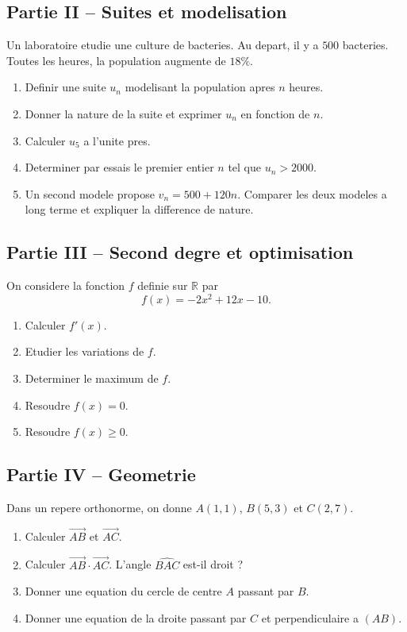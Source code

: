 \documentclass[11pt,a4paper]{article}
\newcommand{\R}{\mathbb{R}}
\newcommand{\vect}[1]{\overrightarrow{#1}}
\begin{document}
\subsection*{Partie II -- Suites et modelisation}
Un laboratoire etudie une culture de bacteries. Au depart, il y a $500$ bacteries. Toutes les heures, la population augmente de $18\%$.
\begin{enumerate}
  \item Definir une suite $u_n$ modelisant la population apres $n$ heures.
  \item Donner la nature de la suite et exprimer $u_n$ en fonction de $n$.
  \item Calculer $u_5$ a l'unite pres.
  \item Determiner par essais le premier entier $n$ tel que $u_n>2000$.
  \item Un second modele propose $v_n=500+120n$. Comparer les deux modeles a long terme et expliquer la difference de nature.
\end{enumerate}

\subsection*{Partie III -- Second degre et optimisation}
On considere la fonction $f$ definie sur $\R$ par
\[
f(x)=-2x^2+12x-10.
\]
\begin{enumerate}
  \item Calculer $f'(x)$.
  \item Etudier les variations de $f$.
  \item Determiner le maximum de $f$.
  \item Resoudre $f(x)=0$.
  \item Resoudre $f(x)\ge0$.
\end{enumerate}

\subsection*{Partie IV -- Geometrie}
Dans un repere orthonorme, on donne $A(1,1)$, $B(5,3)$ et $C(2,7)$.
\begin{enumerate}
  \item Calculer $\vect{AB}$ et $\vect{AC}$.
  \item Calculer $\vect{AB}\cdot\vect{AC}$. L'angle $\widehat{BAC}$ est-il droit ?
  \item Donner une equation du cercle de centre $A$ passant par $B$.
  \item Donner une equation de la droite passant par $C$ et perpendiculaire a $(AB)$.
\end{enumerate}
\end{document}
